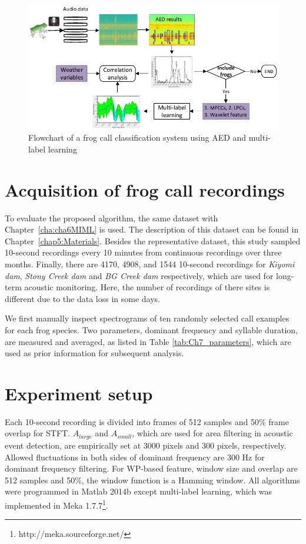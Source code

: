 \begin{figure}[htb!]
\centering
\includegraphics[width=\textwidth]{image/Ch7/flowchart.pdf}
\caption{Flowchart of a frog call classification system using AED and multi-label learning}
\label{fig:Ch7_flowchart}
\end{figure}


\section{Acquisition of frog call recordings}

To evaluate the proposed algorithm, the same dataset with Chapter~\ref{cha:cha6MIML} is used. The description of this dataset can be found in Chapter~\ref{chap5:Materials}. Besides the representative dataset, this study  sampled 10-second recordings every 10 minutes from continuous recordings over three months. Finally, there are 4170, 4908, and 1544 10-second recordings for \textit{Kiyomi dam}, \textit{Stony Creek dam} and \textit{BG Creek dam} respectively, which are used for long-term acoustic monitoring. Here, the number of recordings of there sites is different due to the data loss in some days.




We first manually inspect spectrograms of ten randomly selected call examples for each frog species. Two parameters, dominant frequency and syllable duration, are measured and averaged, as listed in Table \ref{tab:Ch7_parameters}, which are used as prior information for subsequent analysis.



\section{Experiment setup}
Each 10-second recording is divided into frames of 512 samples and 50\% frame overlap for STFT. $A_{large}$ and $A_{small}$, which are used for area filtering in acoustic event detection, are empirically set at 3000 pixels and 300 pixels, respectively. Allowed fluctuations in both sides of dominant frequency are 300 Hz for dominant frequency filtering. For WP-based feature, window size and overlap are 512 samples and 50\%, the window function is a Hamming window. All algorithms were programmed in Matlab 2014b except multi-label learning, which was implemented in Meka 1.7.7\footnote[4]{http://meka.sourceforge.net/}. 




